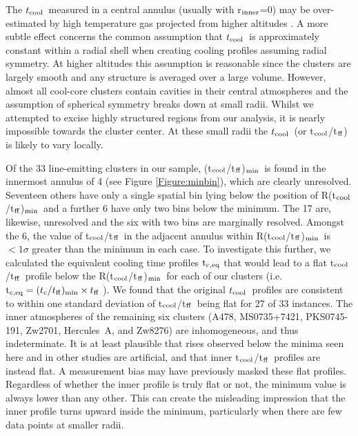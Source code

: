 \documentclass[twocolumn]{aastex6}
\newcommand{\tctff}{{t$_{\rm cool}$/t$_{\rm ff}$}}
\newcommand{\tctffmin}{(\tctff)$_{\rm min}$}
\newcommand{\Rtctffmin}{R(\tctff)$_{\rm min}$}
\newcommand{\tc}{$t_{\rm cool}$}
\begin{document}
The \tc\ measured in a central annulus (usually with r$_{\rm inner}$=0) may be over-estimated by high temperature gas projected from higher altitudes \cite[][]{Hogan17}.  A more subtle effect concerns the common assumption that \tc\ is approximately constant within a radial shell when creating cooling profiles assuming radial symmetry.  At higher altitudes this assumption is reasonable since the clusters are largely smooth and any structure is averaged over a large volume.  However, almost all cool-core clusters contain cavities in their central atmospheres and the assumption of spherical symmetry breaks down at small radii.  Whilst we attempted to excise highly structured regions from our analysis, it is nearly impossible towards the cluster center.  At these small radii the \tc\ (or \tctff) is likely to vary locally. 

Of the 33 line-emitting clusters in our sample, \tctffmin\ is found in the innermost annulus of 4 (see Figure \ref{Figure:minbin}), which are clearly unresolved.  Seventeen others have only a single spatial bin lying below the position of \Rtctffmin\ and a further 6 have only two bins below the minimum.  The 17 are, likewise, unresolved and the six with two bins are marginally resolved.  Amongst the 6, the value of \tctff\ in the adjacent annulus within \Rtctffmin\ is $< 1\sigma$ greater than the minimum in each case.  To investigate this further, we calculated the equivalent cooling time profiles ${\rm t}_{\rm c,eq}$ that would lead to a flat \tctff\ profile below the \Rtctffmin\ for each of our clusters (i.e. ${\rm t}_{\rm c,eq} = ({t_{\rm c}/t_{\rm ff}})_{\rm min} \times t_{\rm ff}$ ).  We found that the original \tc\ profiles are consistent to within one standard deviation of \tctff\ being flat for 27 of 33 instances.  The inner atmospheres of the remaining six clusters (A478, MS0735+7421, PKS0745-191, Zw2701, Hercules~A, and Zw8276) are inhomogeneous, and thus indeterminate.  It is at least plausible that rises observed below the minima seen here and in other studies are artificial, and that inner \tctff\ profiles are instead flat.  A measurement bias may have previously masked these flat profiles.  Regardless of whether the inner profile is truly flat or not, the minimum value is always lower than any other.  This can create the misleading impression that the inner profile turns upward inside the minimum, particularly when there are few data points at smaller radii.
\end{document}
